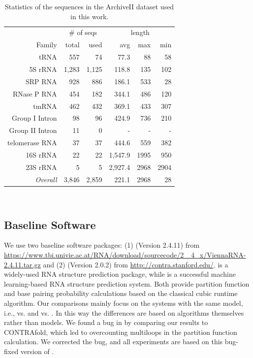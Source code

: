 \begin{table}[!h] %
  \centering
  \large
  \setlength{\tabcolsep}{12pt}
  \begin{tabular}{r|rr|rrr}
    & \multicolumn{2}{c|}{\# of seqs} & \multicolumn{3}{c}{length} \\
    Family & total & used & avg & max & min \\
    \hline
    tRNA  & 557 & 74  & 77.3  & 88 &58  \\
    5S rRNA & 1,283 & 1,125 & 118.8 & 135 &102  \\
    SRP RNA & 928 & 886 & 186.1 & 533 & 28\\
    RNase P RNA & 454 & 182 & 344.1 & 486 & 120 \\
    tmRNA & 462 & 432 & 369.1 & 433 & 307 \\
    Group I Intron  & 98  & 96  & 424.9 & 736 &210  \\
    Group II Intron  & 11  & 0  & - & -&-  \\
    telomerase RNA  & 37  & 37  & 444.6 & 559 &382\\
    16S rRNA  & 22  & 22  & 1,547.9  & 1995 & 950\\
    23S rRNA  & 5 & 5 & 2,927.4  & 2968& 2904\\
    \hline
    {\em Overall} & 3,846 & 2,859 & 221.1 &2968 &28 \\
  \end{tabular}
  \\[0.3cm]
  \caption{Statistics of the sequences in the ArchiveII dataset used in this work.
    \label{tab:archiveII}}
\end{table}


\subsection{Baseline Software}

We use two baseline software packages: 
(1) \viennarnafold %
(Version 2.4.11) 
from 
\url{https://www.tbi.univie.ac.at/RNA/download/sourcecode/2_ 4_x/ViennaRNA-2.4.11.tar.gz} 
and 
(2) \contrafold %
(Version 2.0.2) 
from
\url{http://contra.stanford.edu/}.
\viennarnafold is a widely-used RNA structure prediction package,
while \contrafold is a successful machine learning-based RNA structure prediction system.
Both provide partition function and base pairing probability calculations based on 
the classical cubic runtime algorithm.
Our comparisons mainly focus on the systems with the same model, 
i.e., \linearpartitionv vs. \viennarnafold and \linearpartitionc vs. \contrafold.
In this way the differences are based on algorithms themselves rather than models.
We found a bug in \contrafold by comparing our results to CONTRAfold, 
which led to overcounting multiloops in the partition function calculation.
We corrected the bug, and all experiments are based on this bug-fixed version of \contrafold.


